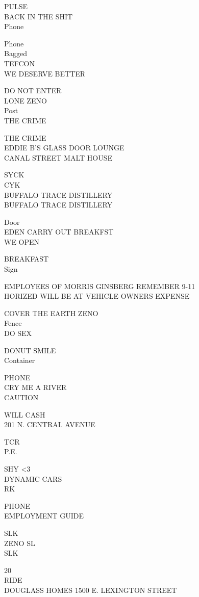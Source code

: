 \documentclass[10pt,letterpaper]{article}
\begin{document}
PULSE\\
BACK IN THE SHIT\\
Phone

Phone\\
Bagged\\
TEFCON\\
WE DESERVE BETTER

DO NOT ENTER\\
LONE ZENO\\
Post\\
THE CRIME

THE CRIME\\
EDDIE B'S GLASS DOOR LOUNGE\\
CANAL STREET MALT HOUSE

SYCK\\
CYK\\
BUFFALO TRACE DISTILLERY\\
BUFFALO TRACE DISTILLERY

Door\\
EDEN CARRY OUT BREAKFST\\
WE OPEN

BREAKFAST\\
Sign

EMPLOYEES OF MORRIS GINSBERG REMEMBER 9{-}11\\
HORIZED WILL BE AT VEHICLE OWNERS EXPENSE

COVER THE EARTH ZENO\\
Fence\\
DO SEX

DONUT SMILE\\
Container

PHONE\\
CRY ME A RIVER\\
CAUTION

WILL CASH\\
201 N. CENTRAL AVENUE

TCR\\
P.E.

SHY <3\\
DYNAMIC CARS\\
RK

PHONE\\
EMPLOYMENT GUIDE

SLK\\
ZENO SL\\
SLK

20\\
RIDE\\
DOUGLASS HOMES 1500 E. LEXINGTON STREET
\end{document}
